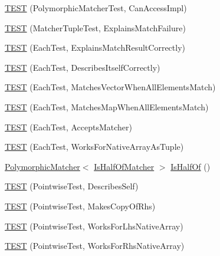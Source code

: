 \begin{DoxyCompactItemize}
\hyperlink{namespacetesting_1_1gmock__matchers__test_a918a64c4594ef6b30f53d735c2e6e6ac}{T\+E\+ST} (Polymorphic\+Matcher\+Test, Can\+Access\+Impl)
\item 
\hyperlink{namespacetesting_1_1gmock__matchers__test_abc9816afa3c83fc92e2c6ecfb2dd8e63}{T\+E\+ST} (Matcher\+Tuple\+Test, Explains\+Match\+Failure)
\item 
\hyperlink{namespacetesting_1_1gmock__matchers__test_adf46df588332aa839b52af952fface1a}{T\+E\+ST} (Each\+Test, Explains\+Match\+Result\+Correctly)
\item 
\hyperlink{namespacetesting_1_1gmock__matchers__test_a183c4b7acec060c6fe3dee650bc97e6d}{T\+E\+ST} (Each\+Test, Describes\+Itself\+Correctly)
\item 
\hyperlink{namespacetesting_1_1gmock__matchers__test_a1310e7e85bf8ea8f2281850167e15465}{T\+E\+ST} (Each\+Test, Matches\+Vector\+When\+All\+Elements\+Match)
\item 
\hyperlink{namespacetesting_1_1gmock__matchers__test_a53e7c1a04b8f178af52eeaa9f190cb64}{T\+E\+ST} (Each\+Test, Matches\+Map\+When\+All\+Elements\+Match)
\item 
\hyperlink{namespacetesting_1_1gmock__matchers__test_a74f7c802ddb6879d3c76ff08d3e242b9}{T\+E\+ST} (Each\+Test, Accepts\+Matcher)
\item 
\hyperlink{namespacetesting_1_1gmock__matchers__test_aef6eeafb03f698d16206836bbb6f05b9}{T\+E\+ST} (Each\+Test, Works\+For\+Native\+Array\+As\+Tuple)
\item 
\hyperlink{classtesting_1_1_polymorphic_matcher}{Polymorphic\+Matcher}$<$ \hyperlink{classtesting_1_1gmock__matchers__test_1_1_is_half_of_matcher}{Is\+Half\+Of\+Matcher} $>$ \hyperlink{namespacetesting_1_1gmock__matchers__test_ace0a8f64b108c7a9c32c2cac15185461}{Is\+Half\+Of} ()
\item 
\hyperlink{namespacetesting_1_1gmock__matchers__test_a2c4c39058405e13e6c6b7fcf8e6bfe43}{T\+E\+ST} (Pointwise\+Test, Describes\+Self)
\item 
\hyperlink{namespacetesting_1_1gmock__matchers__test_a9be60ebc74e280d7eb6668bfa316a765}{T\+E\+ST} (Pointwise\+Test, Makes\+Copy\+Of\+Rhs)
\item 
\hyperlink{namespacetesting_1_1gmock__matchers__test_ad0e797104a482eba2d6c137cf9b676a5}{T\+E\+ST} (Pointwise\+Test, Works\+For\+Lhs\+Native\+Array)
\item 
\hyperlink{namespacetesting_1_1gmock__matchers__test_adabf6a3ceda0024d630d2ece31e37f7c}{T\+E\+ST} (Pointwise\+Test, Works\+For\+Rhs\+Native\+Array)
\item 

\end{DoxyCompactItemize}
